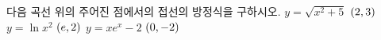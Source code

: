 다음 곡선 위의 주어진 점에서의 접선의 방정식을 구하시오.
 $y=\sqrt{x^2+5}$ \quad $(2{,}\mkern3mu\mathopen{}3)$
 $y=\ln x^2$ \quad $(e{,}\mkern3mu\mathopen{}2)$
 $y=xe^x-2$ \quad $(0{,}\mkern3mu\mathopen{}-2)$
